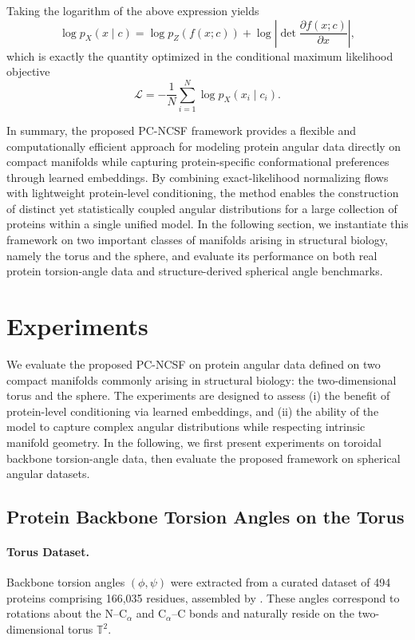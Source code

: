 \documentclass{article}
\begin{document}
Taking the logarithm of the above expression yields
\begin{equation}
\log p_X(x \mid c)
=
\log p_Z(f(x; c)) + \log \left| \det \frac{\partial f(x; c)}{\partial x} \right|,
\end{equation}
which is exactly the quantity optimized in the conditional maximum likelihood objective
\begin{equation}
\mathcal{L} = -\frac{1}{N} \sum_{i=1}^N \log p_X(x_i \mid c_i).
\end{equation}


In summary, the proposed PC-NCSF framework provides a flexible and computationally efficient approach for modeling protein angular data directly on compact manifolds while capturing protein-specific conformational preferences through learned embeddings. By combining exact-likelihood normalizing flows with lightweight protein-level conditioning, the method enables the construction of distinct yet statistically coupled angular distributions for a large collection of proteins within a single unified model. In the following section, we instantiate this framework on two important classes of manifolds arising in structural biology, namely the torus and the sphere, and evaluate its performance on both real protein torsion-angle data and structure-derived spherical angle benchmarks.
 
\section{Experiments}

We evaluate the proposed PC-NCSF on protein angular data defined on two compact manifolds commonly arising in structural biology: the two-dimensional torus and the sphere. 
The experiments are designed to assess (i) the benefit of protein-level conditioning via learned embeddings, and (ii) the ability of the model to capture complex angular distributions while respecting intrinsic manifold geometry.
In the following, we first present experiments on toroidal backbone torsion-angle data, then evaluate the proposed framework on spherical angular datasets.


\subsection{Protein Backbone Torsion Angles on the Torus}

\paragraph{Torus Dataset.}
Backbone torsion angles $(\phi, \psi)$ were extracted from a curated dataset of 494 proteins comprising 166,035 residues, assembled by \cite{Lovell2003}. These angles correspond to rotations about the N--C$_\alpha$ and C$_\alpha$--C bonds and naturally reside on the two-dimensional torus $\mathbb{T}^2$.
\end{document}
